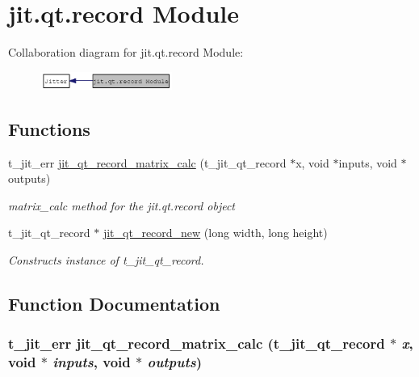 \hypertarget{group__qtrecordmod}{
\section{jit.qt.record Module}
\label{group__qtrecordmod}
}


Collaboration diagram for jit.qt.record Module:\nopagebreak
\begin{figure}[H]
\begin{center}
\leavevmode
\includegraphics[width=122pt]{group__qtrecordmod}
\end{center}
\end{figure}
\subsection*{Functions}
\begin{DoxyCompactItemize}
\item 
t\_\-jit\_\-err \hyperlink{group__qtrecordmod_gab1e36c79f1c120a07ac84ba9fd07a4aa}{jit\_\-qt\_\-record\_\-matrix\_\-calc} (t\_\-jit\_\-qt\_\-record $\ast$x, void $\ast$inputs, void $\ast$outputs)
\begin{DoxyCompactList}\small\item\em matrix\_\-calc method for the jit.qt.record object \item\end{DoxyCompactList}\item 
t\_\-jit\_\-qt\_\-record $\ast$ \hyperlink{group__qtrecordmod_ga7b978ef8ed5477c10ecabf38f7a9e8ea}{jit\_\-qt\_\-record\_\-new} (long width, long height)
\begin{DoxyCompactList}\small\item\em Constructs instance of t\_\-jit\_\-qt\_\-record. \item\end{DoxyCompactList}\end{DoxyCompactItemize}


\subsection{Function Documentation}
\hypertarget{group__qtrecordmod_gab1e36c79f1c120a07ac84ba9fd07a4aa}{
\subsubsection[{jit\_\-qt\_\-record\_\-matrix\_\-calc}]{\setlength{\rightskip}{0pt plus 5cm}t\_\-jit\_\-err jit\_\-qt\_\-record\_\-matrix\_\-calc (t\_\-jit\_\-qt\_\-record $\ast$ {\em x}, \/  void $\ast$ {\em inputs}, \/  void $\ast$ {\em outputs})}}
\label{group__qtrecordmod_gab1e36c79f1c120a07ac84ba9fd07a4aa}


